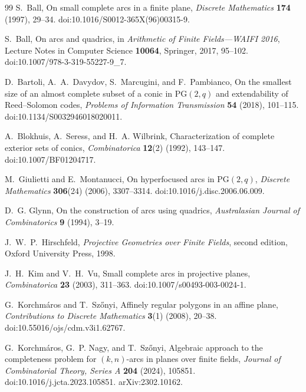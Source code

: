 \documentclass[11pt]{article}
\theoremstyle{definition}
\theoremstyle{remark}
\newcommand{\PG}{\mathrm{PG}}
\begin{document}
\begin{thebibliography}{99}
S.~Ball,
\newblock On small complete arcs in a finite plane,
\newblock \emph{Discrete Mathematics} \textbf{174} (1997), 29--34.
\newblock doi:10.1016/S0012-365X(96)00315-9.

S.~Ball,
\newblock On arcs and quadrics,
\newblock in \emph{Arithmetic of Finite Fields---WAIFI 2016}, Lecture Notes
in Computer Science \textbf{10064}, Springer, 2017, 95--102.
\newblock doi:10.1007/978-3-319-55227-9\_7.

D.~Bartoli, A.~A.~Davydov, S.~Marcugini, and F.~Pambianco,
\newblock On the smallest size of an almost complete subset of a conic in
$\PG(2,q)$ and extendability of Reed--Solomon codes,
\newblock \emph{Problems of Information Transmission} \textbf{54} (2018),
101--115.
\newblock doi:10.1134/S0032946018020011.

A.~Blokhuis, A.~Seress, and H.~A. Wilbrink,
\newblock Characterization of complete exterior sets of conics,
\newblock \emph{Combinatorica} \textbf{12}(2) (1992), 143--147.
\newblock doi:10.1007/BF01204717.

M.~Giulietti and E.~Montanucci,
\newblock On hyperfocused arcs in $\PG(2,q)$,
\newblock \emph{Discrete Mathematics} \textbf{306}(24) (2006), 3307--3314.
\newblock doi:10.1016/j.disc.2006.06.009.

D.~G. Glynn,
\newblock On the construction of arcs using quadrics,
\newblock \emph{Australasian Journal of Combinatorics} \textbf{9} (1994),
3--19.

J.~W.~P.~Hirschfeld,
\newblock \emph{Projective Geometries over Finite Fields}, second edition,
\newblock Oxford University Press, 1998.

J.~H.~Kim and V.~H.~Vu,
\newblock Small complete arcs in projective planes,
\newblock \emph{Combinatorica} \textbf{23} (2003), 311--363.
\newblock doi:10.1007/s00493-003-0024-1.

G.~Korchm\'aros and T.~Sz\H{o}nyi,
\newblock Affinely regular polygons in an affine plane,
\newblock \emph{Contributions to Discrete Mathematics} \textbf{3}(1)
(2008), 20--38.
\newblock doi:10.55016/ojs/cdm.v3i1.62767.

G.~Korchm\'aros, G.~P. Nagy, and T.~Sz\H{o}nyi,
\newblock Algebraic approach to the completeness problem for $(k,n)$-arcs
in planes over finite fields,
\newblock \emph{Journal of Combinatorial Theory, Series A} \textbf{204}
(2024), 105851.
\newblock doi:10.1016/j.jcta.2023.105851.
\newblock arXiv:2302.10162.


\end{thebibliography}
\end{document}
